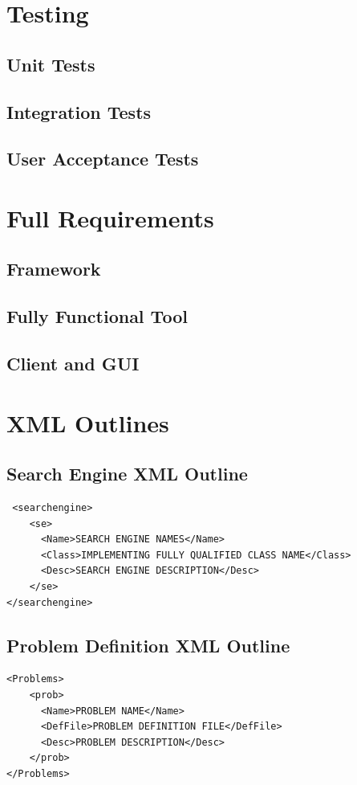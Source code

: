 \documentclass[authoryearcitations]{UoYCSproject}
\begin{document}
\chapter{Testing}
\section{Unit Tests}
\section{Integration Tests}
\section{User Acceptance Tests}



\appendix
\chapter{Full Requirements}
\label{sec:reqs}
\section{Framework}
\section{Fully Functional Tool}
\section{Client and GUI}

\chapter{XML Outlines}
\section{Search Engine XML Outline}
\label{sec:semanspecxml}
\lstset{language = XML}
\begin{lstlisting}
 <searchengine>
	<se>
	  <Name>SEARCH ENGINE NAMES</Name>
	  <Class>IMPLEMENTING FULLY QUALIFIED CLASS NAME</Class>
	  <Desc>SEARCH ENGINE DESCRIPTION</Desc>
	</se>
</searchengine>
\end{lstlisting}

\section{Problem Definition XML Outline}
\label{sec:probmanspecxml}
\lstset{language = XML}
\begin{lstlisting}
<Problems>
	<prob>
	  <Name>PROBLEM NAME</Name>
	  <DefFile>PROBLEM DEFINITION FILE</DefFile>
	  <Desc>PROBLEM DESCRIPTION</Desc>
	</prob>
</Problems>
\end{lstlisting}
\end{document}

